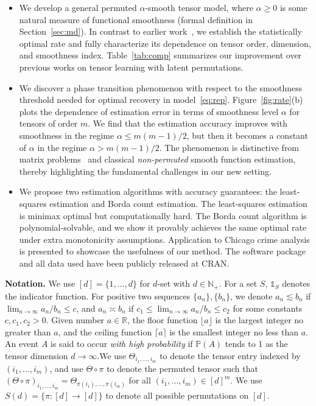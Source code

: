 \documentclass{article}
\theoremstyle{definition}
\begin{document}
\begin{itemize}[wide,labelwidth=0pt, labelindent=0pt,itemsep=.4ex,topsep=-2pt]
\item We develop a general permuted $\alpha$-smooth tensor model, where $\alpha\geq 0$ is some natural measure of functional smoothness (formal definition in Section~\ref{sec:md}). In contrast to earlier work~\cite{balasubramanian2021nonparametric,li2019nearest}, we establish the statistically optimal rate and fully characterize its dependence on tensor order, dimension, and smoothness index. Table~\ref{tab:comp} summarizes our improvement over previous works on tensor learning with latent permutations. 

\item We discover a phase transition phenomenon with respect to the smoothness threshold needed for optimal recovery in model~\eqref{eq:rep}. 
Figure~\ref{fig:rate}(b) plots the dependence of estimation error in terms of smoothness level $\alpha$ for tensors of order $m$. We find that the estimation accuracy improves with smoothness in the regime $\alpha \leq m(m-1)/2$, but then it becomes a constant of $\alpha$ in the regime $ \alpha > m(m-1)/2$. The phenomenon is distinctive from matrix problems~\citep{klopp2017oracle} and classical \emph{non-permuted} smooth function estimation, thereby highlighting the fundamental challenges in our new setting. 

\item We propose two estimation algorithms with accuracy guarantees: the least-squares estimation and Borda count estimation. The least-squares estimation is minimax optimal but computationally hard. The Borda count algorithm is polynomial-solvable, and we show it provably achieves the same optimal rate under extra monotonicity assumptions. Application to Chicago crime analysis is presented to showcase the usefulness of our method. The software package and all data used have been publicly released at CRAN.
\end{itemize}


{\bf Notation.} We use $[d]=\{1,\ldots,d\}$ for $d$-set with $d\in\mathbb{N}_{+}$. For a set $S$, $\mathds{1}_S$ denotes the indicator function. For positive two sequences $\{a_n\},\{b_n\}$,  we denote $a_n\lesssim b_n$ if $\lim_{n\to\infty} a_n/b_n\leq c$,  and $a_n\asymp b_n$ if $c_1\leq \lim_{n\to \infty} a_n/b_n\leq c_2$ for some constants $c,c_1,c_2>0$. Given number $a\in\mathbb{R}$, the floor function $\lfloor a\rfloor$ is the largest integer no greater than $a$, and the ceiling function $\lceil a\rceil$ is the smallest integer no less than $a$. An event $A$ is said to occur \emph{with high probability} if $\mathbb{P}(A)$ tends to 1 as the tensor dimension $d\to\infty$.We use $\Theta_{i_1,\ldots,i_m}$ to denote the tensor entry indexed by $(i_1,\ldots,i_m)$, and use $\Theta\circ\pi$ to denote the permuted tensor such that $(\Theta\circ\pi)_{i_1,\ldots,i_m} = \Theta_{\pi(i_1),\ldots,\pi(i_m)}$ for all $(i_1,\ldots,i_m)\in[d]^m$. We use $S(d)=\{\pi\colon [d]\to[d]\}$ to denote all possible permutations on $[d]$.
\end{document}
